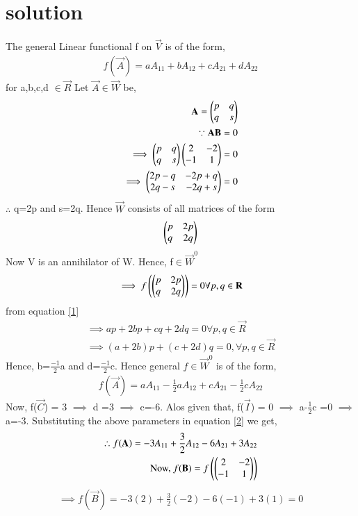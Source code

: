 \documentclass[journal,12pt,twocolumn]{IEEEtran}
\begin{document}
\section{solution}
The general Linear functional f on $\vec{V}$ is of the form,
\begin{align}
f(\vec{A}) = aA_{11}+bA_{12}+cA_{21}+dA_{22}
\label{1}
\end{align}
for a,b,c,d $\in\vec{R}$
Let $\vec{A} \in \vec{W}$ be,
\begin{align}
\mathbf{A} = \begin{pmatrix}p&q\\q&s\end{pmatrix}\\
\because \mathbf{AB} = 0\\
\implies \begin{pmatrix}p&q\\q&s\end{pmatrix}\begin{pmatrix}2&-2\\-1&1\end{pmatrix} = 0\\
\implies \begin{pmatrix}2p-q&-2p+q\\2q-s&-2q+s\end{pmatrix} = 0
\end{align}
$\therefore$ q=2p and s=2q.
Hence $\vec{W}$ consists of all matrices of the form 
\begin{align}
\begin{pmatrix}p&2p\\q&2q\end{pmatrix}
\end{align}
Now V is an annihilator of W. Hence, f$\in\vec{W}^0$
\begin{align}
\implies f\left(\begin{pmatrix}p&2p\\q&2q\end{pmatrix}\right) = 0 \forall p,q \in \mathbf{R}
\end{align}
from equation \eqref{1}
\begin{align}
\implies ap+2bp+cq+2dq = 0 \forall p,q \in \vec{R}\\
\implies (a+2b)p + (c+2d)q = 0, \forall p,q \in \vec{R}
\end{align}
Hence, b=$\frac{-1}{2}$a and d=$\frac{-1}{2}$c. Hence general $f\in\vec{W}^0$ is of the form,
\begin{align}
f(\vec{A}) = aA_{11}-\frac{1}{2}a A_{12}+cA_{21}-\frac{1}{2}cA_{22}
\label{2}
\end{align}
Now, f($\vec{C}$) = 3 $\implies$ d =3 $\implies$ c=-6. Alos given that, f($\vec{I}$) = 0 $\implies$ a-$\frac{1}{2}$c =0 $\implies$ a=-3. Substituting the above parameters in equation \eqref{2} we get,
\begin{align}
\therefore f(\mathbf{A}) = -3A_{11}+\frac{3}{2} A_{12}-6A_{21}+3A_{22} \\
\mbox{Now, } f(\mathbf{B}) = f\left(\begin{pmatrix}2&-2\\-1&1\end{pmatrix}\right) 
\end{align}
\begin{align}
\implies f(\vec{B}) = -3(2)+\frac{3}{2}(-2)-6(-1)+3(1) = 0 
\end{align}
\end{document}
